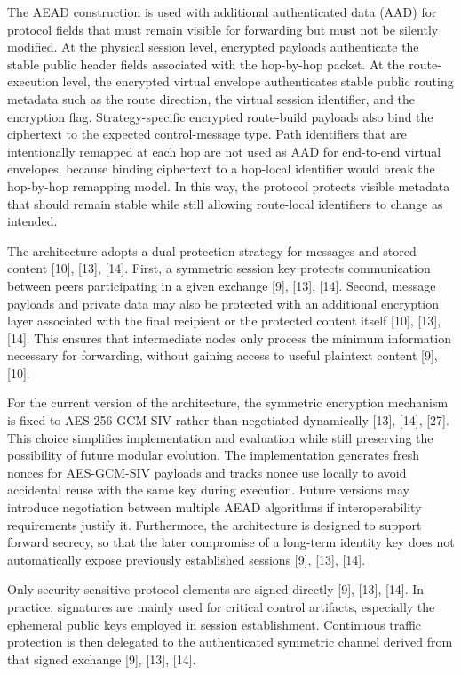 \documentclass[12pt,a4paper]{article}
\begin{document}
The AEAD construction is used with additional authenticated data (AAD) for protocol fields that must remain visible for forwarding but must not be silently modified. At the physical session level, encrypted payloads authenticate the stable public header fields associated with the hop-by-hop packet. At the route-execution level, the encrypted virtual envelope authenticates stable public routing metadata such as the route direction, the virtual session identifier, and the encryption flag. Strategy-specific encrypted route-build payloads also bind the ciphertext to the expected control-message type. Path identifiers that are intentionally remapped at each hop are not used as AAD for end-to-end virtual envelopes, because binding ciphertext to a hop-local identifier would break the hop-by-hop remapping model. In this way, the protocol protects visible metadata that should remain stable while still allowing route-local identifiers to change as intended.

The architecture adopts a dual protection strategy for messages and stored content [10], [13], [14]. First, a symmetric session key protects communication between peers participating in a given exchange [9], [13], [14]. Second, message payloads and private data may also be protected with an additional encryption layer associated with the final recipient or the protected content itself [10], [13], [14]. This ensures that intermediate nodes only process the minimum information necessary for forwarding, without gaining access to useful plaintext content [9], [10].

For the current version of the architecture, the symmetric encryption mechanism is fixed to AES-256-GCM-SIV rather than negotiated dynamically [13], [14], [27]. This choice simplifies implementation and evaluation while still preserving the possibility of future modular evolution. The implementation generates fresh nonces for AES-GCM-SIV payloads and tracks nonce use locally to avoid accidental reuse with the same key during execution. Future versions may introduce negotiation between multiple AEAD algorithms if interoperability requirements justify it. Furthermore, the architecture is designed to support forward secrecy, so that the later compromise of a long-term identity key does not automatically expose previously established sessions [9], [13], [14].

Only security-sensitive protocol elements are signed directly [9], [13], [14]. In practice, signatures are mainly used for critical control artifacts, especially the ephemeral public keys employed in session establishment. Continuous traffic protection is then delegated to the authenticated symmetric channel derived from that signed exchange [9], [13], [14].
\end{document}
